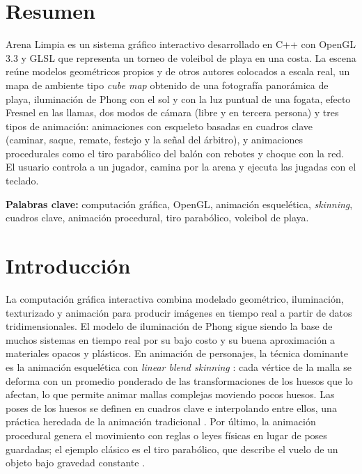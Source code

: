 \documentclass[12pt,letterpaper]{article}
\begin{document}
\newpage
\tableofcontents
\newpage

\section*{Resumen}
Arena Limpia es un sistema gráfico interactivo desarrollado en C++ con OpenGL 3.3 y GLSL que
representa un torneo de voleibol de playa en una costa. La escena reúne modelos geométricos
propios y de otros autores colocados a escala real, un mapa de ambiente tipo \emph{cube map}
obtenido de una fotografía panorámica de playa, iluminación de Phong con el sol y con la luz
puntual de una fogata, efecto Fresnel en las llamas, dos modos de cámara (libre y en tercera persona) y tres tipos de animación:
animaciones con esqueleto basadas en cuadros clave (caminar, saque, remate, festejo y la señal
del árbitro), y animaciones procedurales como el tiro parabólico del balón con rebotes y
choque con la red. El usuario controla a un jugador, camina por la arena y ejecuta las
jugadas con el teclado.

\noindent\textbf{Palabras clave:} computación gráfica, OpenGL, animación esquelética,
\emph{skinning}, cuadros clave, animación procedural, tiro parabólico, voleibol de playa.

\section{Introducción}
La computación gráfica interactiva combina modelado geométrico, iluminación, texturizado y
animación para producir imágenes en tiempo real a partir de datos tridimensionales. El
modelo de iluminación de Phong \cite{phong1975} sigue siendo la base de muchos sistemas en
tiempo real por su bajo costo y su buena aproximación a materiales opacos y plásticos. En
animación de personajes, la técnica dominante es la animación esquelética con
\emph{linear blend skinning} \cite{magnenat1988}: cada vértice de la malla se deforma con un
promedio ponderado de las transformaciones de los huesos que lo afectan, lo que permite
animar mallas complejas moviendo pocos huesos. Las poses de los huesos se definen en cuadros
clave e interpolando entre ellos, una práctica heredada de la animación tradicional
\cite{lasseter1987}. Por último, la animación procedural genera el movimiento con reglas o
leyes físicas en lugar de poses guardadas; el ejemplo clásico es el tiro parabólico, que
describe el vuelo de un objeto bajo gravedad constante \cite{halliday2014}.
\end{document}
